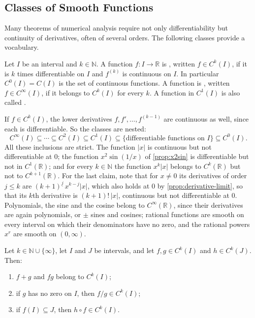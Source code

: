 \subsection{Classes of Smooth Functions}

Many theorems of numerical analysis require not only differentiability but continuity of derivatives, often of several orders. The following classes provide a vocabulary.

\begin{definition}
\label{def:ck}
Let $I$ be an interval and $k\in\mathbb N$. A function $f\colon I\to\mathbb R$ is , written $f\in C^k(I)$, if it is $k$ times differentiable on $I$ and $f^{(k)}$ is continuous on $I$. In particular $C^0(I)=C(I)$ is the set of continuous functions. A function is , written $f\in C^\infty(I)$, if it belongs to $C^k(I)$ for every $k$. A function in $C^1(I)$ is also called .
\end{definition}

If $f\in C^k(I)$, the lower derivatives $f,f',\ldots,f^{(k-1)}$ are continuous as well, since each is differentiable. So the classes are nested:
\[
C^\infty(I)\subseteq\cdots\subseteq C^2(I)\subseteq C^1(I)\subseteq\{\text{differentiable functions on }I\}\subseteq C^0(I).
\]
All these inclusions are strict. The function $|x|$ is continuous but not differentiable at $0$; the function $x^2\sin(1/x)$ of \cref{prop:x2sin} is differentiable but not in $C^1(\mathbb R)$; and for every $k\in\mathbb N$ the function $x^k|x|$ belongs to $C^k(\mathbb R)$ but not to $C^{k+1}(\mathbb R)$. For the last claim, note that for $x\ne0$ its derivatives of order $j\le k$ are $(k+1)^{\underline j}\,x^{k-j}|x|$, which also holds at $0$ by \cref{prop:derivative-limit}, so that its $k$th derivative is $(k+1)!\,|x|$, continuous but not differentiable at $0$. Polynomials, the sine and the cosine belong to $C^\infty(\mathbb R)$, since their derivatives are again polynomials, or $\pm$ sines and cosines; rational functions are smooth on every interval on which their denominators have no zero, and the rational powers $x^r$ are smooth on $(0,\infty)$.

\begin{proposition}
\label{prop:ck-algebra}
Let $k\in\mathbb N\cup\{\infty\}$, let $I$ and $J$ be intervals, and let $f,g\in C^k(I)$ and $h\in C^k(J)$. Then:
\begin{enumerate}
\item $f+g$ and $fg$ belong to $C^k(I)$;
\item if $g$ has no zero on $I$, then $f/g\in C^k(I)$;
\item if $f(I)\subseteq J$, then $h\circ f\in C^k(I)$.
\end{enumerate}
\end{proposition}

